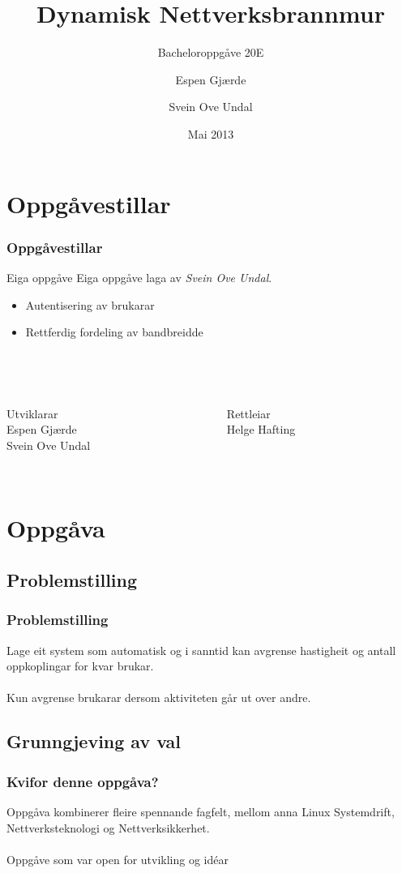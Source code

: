 \documentclass[nynorsk,14pt]{beamer}
\title[Bacheloroppgåve 20E 2013]{Dynamisk Nettverksbrannmur}
\subtitle{Bacheloroppgåve 20E}
\author[E.Gjærde, S.O.Undal] {Espen Gjærde \and Svein Ove Undal}
\institute[Høgskolen i Sør-Trøndelag]{
		HiST\\
		Avdeling for Informatikk og e-Læring	
}
\date{Mai 2013}
\begin{document}
	

\frame{\titlepage}

\begin{frame}
	\tableofcontents
\end{frame}
\section{Oppgåvestillar}
\begin{frame} %
	\frametitle{Oppgåvestillar}
		\begin{alertblock}{Eiga oppgåve}
			Eiga oppgåve laga av \emph{Svein Ove Undal}.
		\end{alertblock}
		\begin{itemize}
			\item Autentisering av brukarar
			\item Rettferdig fordeling av bandbreidde
		\end{itemize}
		\\ ~
	\begin{columns}[t]
		\begin{column}[T]{5cm}
		\alert {Utviklarar} \\
		Espen Gjærde \\
		Svein Ove Undal \\ ~ \\
		\end{column}		
		\begin{column}[B]{5cm}
		\alert{Rettleiar} \\	Helge Hafting
		\end{column}
	\end{columns}
\end{frame}
\section{Oppgåva}
\subsection{Problemstilling}
\begin{frame} %
	\frametitle{Problemstilling}
	 Lage eit system som automatisk og i sanntid kan avgrense hastigheit og antall oppkoplingar for kvar brukar. \\ ~ \\
	Kun avgrense brukarar dersom aktiviteten går ut over andre.
\end{frame}
\subsection{Grunngjeving av val}
\begin{frame} %
	\frametitle{Kvifor denne oppgåva?}
	Oppgåva kombinerer fleire spennande fagfelt, mellom anna Linux Systemdrift, Nettverksteknologi og Nettverksikkerhet. 
	\\ ~ \\
	Oppgåve som var open for utvikling og idéar
	\\ ~ \\
	
\end{frame}
\end{document}

